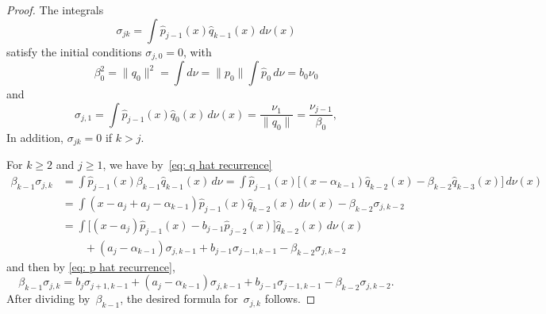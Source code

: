 \documentclass[12pt,a4paper]{article}
\begin{document}
\begin{proof}
The integrals
\[
\sigma_{jk}=\int\hat p_{j-1}(x)\hat q_{k-1}(x)\,d\nu(x)
\]
satisfy the initial conditions $\sigma_{j,0}=0$, with
\[
\beta_0^2=\|q_0\|^2=\int d\nu=\|p_0\|\int\hat p_0\,d\nu=b_0\nu_0
\]
and
\[
\sigma_{j,1}=\int\hat p_{j-1}(x)\hat q_0(x)\,d\nu(x)=\frac{\nu_1}{\|q_0\|}
=\frac{\nu_{j-1}}{\beta_0},
\]
In addition, $\sigma_{jk}=0$ if $k>j$.

For $k\ge2$ and $j\ge1$, we have by~\eqref{eq: q hat recurrence}
\begin{align*}
\beta_{k-1}\sigma_{j,k}&=\int\hat p_{j-1}(x)\beta_{k-1}\hat q_{k-1}(x)\,d\nu
	=\int\hat p_{j-1}(x)\bigl[
	(x-\alpha_{k-1})\hat q_{k-2}(x)-\beta_{k-2}\hat q_{k-3}(x)\bigr]\,d\nu(x)\\
	&=\int(x-a_j+a_j-\alpha_{k-1})
		\hat p_{j-1}(x)\hat q_{k-2}(x)\,d\nu(x)
		-\beta_{k-2}\sigma_{j,k-2}\\
	&=\int\bigl[(x-a_j)\hat p_{j-1}(x)-b_{j-1}\hat p_{j-2}(x)\bigr]
		\hat q_{k-2}(x)\,d\nu(x)\\
	&\qquad{}+(a_j-\alpha_{k-1})\sigma_{j,k-1}
		+b_{j-1}\sigma_{j-1,k-1}-\beta_{k-2}\sigma_{j,k-2}
\end{align*}
and then by \eqref{eq: p hat recurrence},
\begin{equation}\label{eq: beta sigma}
\beta_{k-1}\sigma_{j,k}=b_j\sigma_{j+1,k-1}
	+(a_j-\alpha_{k-1})\sigma_{j,k-1}
		+b_{j-1}\sigma_{j-1,k-1}-\beta_{k-2}\sigma_{j,k-2}.
\end{equation}
After dividing by~$\beta_{k-1}$, the desired formula for~$\sigma_{j,k}$
follows.


\end{proof}
\end{document}
